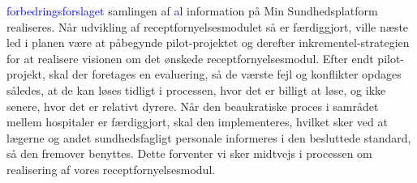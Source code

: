 \textcolor{blue}{forbedringsforslaget} samlingen af 
 \textcolor{blue}{al} information på Min Sundhedsplatform realiseres. Når udvikling af receptfornyelsesmodulet så er færdiggjort, ville næste led i planen være at påbegynde pilot-projektet og derefter inkrementel-strategien for at realisere visionen om det ønskede receptfornyelsesmodul. Efter endt pilot-projekt, skal der foretages en evaluering, så de værste fejl og konflikter opdages således, at de kan løses tidligt i processen, hvor det er billigt at løse, og ikke senere, hvor det er relativt dyrere. 
Når den beaukratiske proces i samrådet mellem hospitaler er færdiggjort, skal den implementeres, hvilket sker ved at lægerne og andet sundhedsfagligt personale informeres i den besluttede standard, så den fremover benyttes. Dette forventer vi sker midtvejs i processen om realisering af vores receptfornyelsesmodul.
